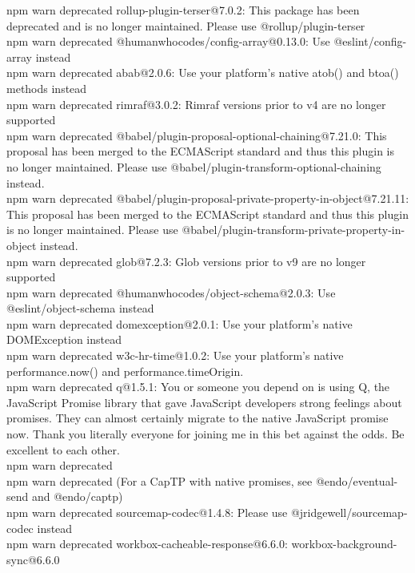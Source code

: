 \documentclass[12pt, a4paper]{article}
\begin{document}
\begin{monoblock}
            npm warn deprecated rollup-plugin-terser@7.0.2: This package has been deprecated and is no longer maintained. Please use @rollup/plugin-terser \\
            npm warn deprecated @humanwhocodes/config-array@0.13.0: Use @eslint/config-array instead \\
            npm warn deprecated abab@2.0.6: Use your platform's native atob() and btoa() methods instead \\
            npm warn deprecated rimraf@3.0.2: Rimraf versions prior to v4 are no longer supported \\
            npm warn deprecated @babel/plugin-proposal-optional-chaining@7.21.0: This proposal has been merged to the ECMAScript standard and thus this plugin is no longer maintained. Please use @babel/plugin-transform-optional-chaining instead. \\
            npm warn deprecated @babel/plugin-proposal-private-property-in-object@7.21.11: This proposal has been merged to the ECMAScript standard and thus this plugin is no longer maintained. Please use @babel/plugin-transform-private-property-in-object instead. \\
            npm warn deprecated glob@7.2.3: Glob versions prior to v9 are no longer supported \\
            npm warn deprecated @humanwhocodes/object-schema@2.0.3: Use @eslint/object-schema instead \\
            npm warn deprecated domexception@2.0.1: Use your platform's native DOMException instead \\
            npm warn deprecated w3c-hr-time@1.0.2: Use your platform's native performance.now() and performance.timeOrigin. \\
            npm warn deprecated q@1.5.1: You or someone you depend on is using Q, the JavaScript Promise library that gave JavaScript developers strong feelings about promises. They can almost certainly migrate to the native JavaScript promise now. Thank you literally everyone for joining me in this bet against the odds. Be excellent to each other. \\
            npm warn deprecated \\
            npm warn deprecated (For a CapTP with native promises, see @endo/eventual-send and @endo/captp) \\
            npm warn deprecated sourcemap-codec@1.4.8: Please use @jridgewell/sourcemap-codec instead \\
            npm warn deprecated workbox-cacheable-response@6.6.0: workbox-background-sync@6.6.0 \\

\end{monoblock}
\end{document}

